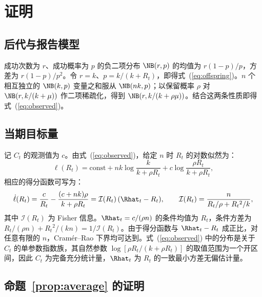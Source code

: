 \clearpage
\appendix
{}
\renewcommand{\theequation}{\thesection.\arabic{equation}}

\section{证明}
\label{app:proofs}

\subsection{后代与报告模型}
\label{app:model}

成功次数为 $r$、成功概率为 $p$ 的负二项分布 $\NB(r,p)$ 的均值为 $r(1-p)/p$，方差为 $r(1-p)/p^2$。令 $r=k$、$p=k/(k+R_t)$，即得式~(\ref{eq:offspring})。$n$ 个相互独立的 $\NB(k,p)$ 变量之和服从 $\NB(nk,p)$；以保留概率 $\rho$ 对 $\NB(r,k/(k+\mu))$ 作二项稀疏化，得到 $\NB(r,k/(k+\rho\mu))$。结合这两条性质即得式~(\ref{eq:observed})。

\subsection{当期目标量}
\label{app:target1}

记 $C_t$ 的观测值为 $c$。由式~(\ref{eq:observed})，给定 $n$ 时 $R_t$ 的对数似然为：
\begin{equation}
  \ell(R_t)=\text{const}+nk\log\frac{k}{k+\rho R_t}+c\log\frac{\rho R_t}{k+\rho R_t},
\end{equation}
相应的得分函数可写为：
\begin{equation}
  \dot{\ell}(R_t)=\frac{c}{R_t}-\frac{(c+nk)\rho}{k+\rho R_t}=\mathcal{I}(R_t)\,(\Rhat_t-R_t),\qquad %
  \mathcal{I}(R_t)=\frac{n}{R_t/\rho+R_t{}^2/k},
  \label{eq:score}
\end{equation}
其中 $\mathcal{I}(R_t)$ 为 Fisher 信息。$\Rhat_t=c/(\rho n)$ 的条件均值为 $R_t$，条件方差为 $R_t/(\rho n)+R_t{}^2/(kn)=1/\mathcal{I}(R_t)$。由于得分函数与 $\Rhat_t-R_t$ 成正比，对任意有限的 $n$，Cram\'er--Rao 下界均可达到。式~(\ref{eq:observed}) 中的分布是关于 $C_t$ 的单参数指数族，其自然参数 $\log[\rho R_t/(k+\rho R_t)]$ 的取值范围为一个开区间，因此 $C_t$ 为完备充分统计量，$\Rhat_t$ 为 $R_t$ 的一致最小方差无偏估计量\citep{lehmann2005testing}。

\subsection{命题~\ref{prop:average} 的证明}
\label{app:prop1}

